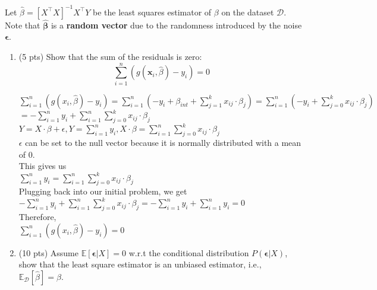\documentclass[11pt]{article}
\renewcommand{\vec}[1]{\mathbf{#1}}
\begin{document}
Let $\hat{\beta}=[X^\top X]^{-1}X^\top Y$ be the least squares estimator of $\beta$ on the dataset $\mathcal{D}$. Note that $\hat{\vec{\beta}}$ is a \textbf{random vector} due to the randomness introduced by the noise $\boldsymbol{\epsilon}$.
\begin{enumerate}
\item (5 pts) Show that the sum of the residuals is zero:
\[\sum_{i=1}^n(g(\mathbf{x}_i, \hat{\beta}) -y_i)=0\]

\begin{answertext}{6cm}{}

$\sum_{i=1}^{n} (g(x_i,\hat{\beta}) - y_i) = \sum_{i=1}^{n} (-y_i + \beta_{int} + \sum_{j=1}^{k} x_{ij} \cdot \beta_j) = \sum_{i=1}^{n} (-y_i + \sum_{j=0}^{k} x_{ij} \cdot \beta_j)$\\
$= -\sum_{i=1}^{n} y_i + \sum_{i=1}^{n} \sum_{j=0}^{k} x_{ij} \cdot \beta_j$\\
$Y = X \cdot \beta + \epsilon, Y = \sum_{i=1}^{n} y_i, X \cdot \beta = \sum_{i=1}^{n} \sum_{j=0}^{k} x_{ij} \cdot \beta_j$\\
$\epsilon$ can be set to the null vector because it is normally distributed with a mean of $0$.\\
This gives us\\
$\sum_{i=1}^{n}y_i = \sum_{i=1}^{n}\sum_{j=0}^{k}x_{ij} \cdot \beta_j$\\
Plugging back into our initial problem, we get\\
$-\sum_{i=1}^{n} y_i + \sum_{i=1}^{n} \sum_{j=0}^{k} x_{ij} \cdot \beta_j = -\sum_{i=1}^{n} y_i + \sum_{i=1}^{n} y_i = 0$\\
Therefore,\\
$\sum_{i=1}^{n} (g(x_i,\hat{\beta}) - y_i) = 0$

\end{answertext} 
\pagebreak
\item (10 pts)  Assume  $\mathbb{E}[\boldsymbol{\epsilon}|X]=0$ w.r.t the conditional distribution $P(\boldsymbol{\epsilon}|X)$, show that the least square estimator is an unbiased estimator, i.e., $\mathbb{E}_{\mathcal{D}}[\hat{\beta}]=\beta$.

\begin{answertext}{9cm}{}



\end{answertext}
\end{enumerate}
\end{document}
